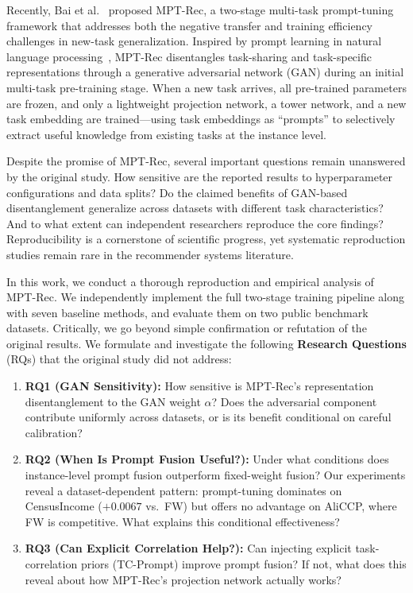 \documentclass[review,anonymous]{acmart}
\begin{document}
Recently, Bai et al.~\cite{bai2025efficient} proposed MPT-Rec, a two-stage multi-task
prompt-tuning framework that addresses both the negative transfer and training
efficiency challenges in new-task generalization. Inspired by prompt learning in
natural language processing~\cite{lester2021power,li2021prefix}, MPT-Rec
disentangles task-sharing and task-specific representations through a generative
adversarial network (GAN) during an initial multi-task pre-training stage. When a
new task arrives, all pre-trained parameters are frozen, and only a lightweight
projection network, a tower network, and a new task embedding are trained---using
task embeddings as ``prompts'' to selectively extract useful knowledge from existing
tasks at the instance level.

Despite the promise of MPT-Rec, several important questions remain unanswered by
the original study. How sensitive are the reported results to hyperparameter
configurations and data splits? Do the claimed benefits of GAN-based disentanglement
generalize across datasets with different task characteristics? And to what extent
can independent researchers reproduce the core findings? Reproducibility is a
cornerstone of scientific progress, yet systematic reproduction studies remain rare
in the recommender systems literature.

In this work, we conduct a thorough reproduction and empirical analysis of MPT-Rec.
We independently implement the full two-stage training pipeline along with seven
baseline methods, and evaluate them on two public benchmark datasets. Critically,
we go beyond simple confirmation or refutation of the original results. We
formulate and investigate the following \textbf{Research Questions} (RQs) that
the original study did not address:

\begin{enumerate}
  \item \textbf{RQ1 (GAN Sensitivity):} How sensitive is MPT-Rec's representation
    disentanglement to the GAN weight $\alpha$? Does the adversarial component
    contribute uniformly across datasets, or is its benefit conditional on
    careful calibration?

  \item \textbf{RQ2 (When Is Prompt Fusion Useful?):} Under what conditions does
    instance-level prompt fusion outperform fixed-weight fusion? Our experiments
    reveal a dataset-dependent pattern: prompt-tuning dominates on CensusIncome
    ($+0.0067$ vs.\ FW) but offers no advantage on AliCCP, where FW is
    competitive. What explains this conditional effectiveness?

  \item \textbf{RQ3 (Can Explicit Correlation Help?):} Can injecting explicit
    task-correlation priors (TC-Prompt) improve prompt fusion? If not, what does
    this reveal about how MPT-Rec's projection network actually works?
\end{enumerate}
\end{document}
